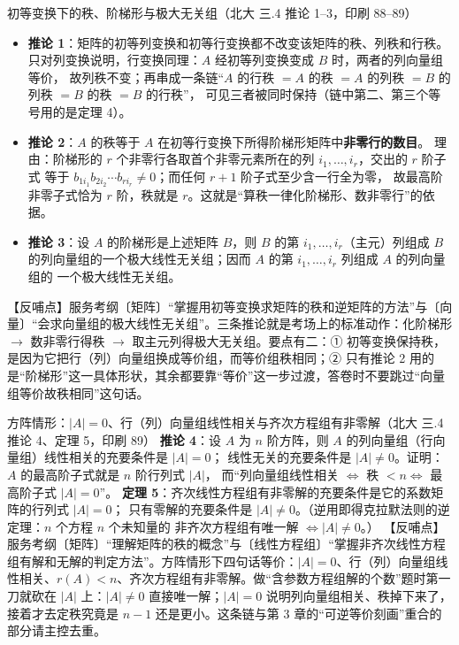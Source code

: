 \begin{fdeep}{初等变换下的秩、阶梯形与极大无关组（北大 三.4 推论 1--3，印刷 88--89）}
\begin{itemize}[leftmargin=2.2em,itemsep=0.25em]
\item \textbf{推论 1}：矩阵的初等列变换和初等行变换都不改变该矩阵的秩、列秩和行秩。
      只对列变换说明，行变换同理：$A$ 经初等列变换变成 $B$ 时，两者的列向量组等价，
      故列秩不变；再串成一条链“$A$ 的行秩 $=A$ 的秩 $=A$ 的列秩 $=B$ 的列秩 $=B$ 的秩 $=B$ 的行秩”，
      可见三者被同时保持（链中第二、第三个等号用的是定理 4）。
\item \textbf{推论 2}：$A$ 的秩等于 $A$ 在初等行变换下所得阶梯形矩阵中\textbf{非零行的数目}。
      理由：阶梯形的 $r$ 个非零行各取首个非零元素所在的列 $i_1,\dots,i_r$，交出的 $r$ 阶子式
      等于 $b_{1i_1}b_{2i_2}\cdots b_{ri_r}\ne0$；而任何 $r+1$ 阶子式至少含一行全为零，
      故最高阶非零子式恰为 $r$ 阶，秩就是 $r$。这就是“算秩一律化阶梯形、数非零行”的依据。
\item \textbf{推论 3}：设 $A$ 的阶梯形是上述矩阵 $B$，则 $B$ 的第 $i_1,\dots,i_r$（主元）列组成
      $B$ 的列向量组的一个极大线性无关组；因而 $A$ 的第 $i_1,\dots,i_r$ 列组成 $A$ 的列向量组的
      一个极大线性无关组。
\end{itemize}
【反哺点】服务考纲〔矩阵〕“掌握用初等变换求矩阵的秩和逆矩阵的方法”与〔向量〕“会求向量组的极大线性无关组”。三条推论就是考场上的标准动作：化阶梯形 $\to$ 数非零行得秩 $\to$ 取主元列得极大无关组。要点有二：① 初等变换保持秩，是因为它把行（列）向量组换成等价组，而等价组秩相同；② 只有推论 2 用的是“阶梯形”这一具体形状，其余都要靠“等价”这一步过渡，答卷时不要跳过“向量组等价故秩相同”这句话。
\end{fdeep}

\begin{fdeep}{方阵情形：$|A|=0$、行（列）向量组线性相关与齐次方程组有非零解（北大 三.4 推论 4、定理 5，印刷 89）}
\textbf{推论 4}：设 $A$ 为 $n$ 阶方阵，则 $A$ 的列向量组（行向量组）线性相关的充要条件是 $|A|=0$；
线性无关的充要条件是 $|A|\ne0$。证明：$A$ 的最高阶子式就是 $n$ 阶行列式 $|A|$，
而“列向量组线性相关 $\iff$ 秩 $<n\iff$ 最高阶子式 $|A|=0$”。
\textbf{定理 5}：齐次线性方程组有非零解的充要条件是它的系数矩阵的行列式 $|A|=0$；
只有零解的充要条件是 $|A|\ne0$。（逆用即得克拉默法则的逆定理：$n$ 个方程 $n$ 个未知量的
非齐次方程组有唯一解 $\iff|A|\ne0$。）
【反哺点】服务考纲〔矩阵〕“理解矩阵的秩的概念”与〔线性方程组〕“掌握非齐次线性方程组有解和无解的判定方法”。方阵情形下四句话等价：$|A|=0$、行（列）向量组线性相关、$r(A)<n$、齐次方程组有非零解。做“含参数方程组解的个数”题时第一刀就砍在 $|A|$ 上：$|A|\ne0$ 直接唯一解；$|A|=0$ 说明列向量组相关、秩掉下来了，接着才去定秩究竟是 $n-1$ 还是更小。这条链与第 3 章的“可逆等价刻画”重合的部分请主控去重。
\end{fdeep}

